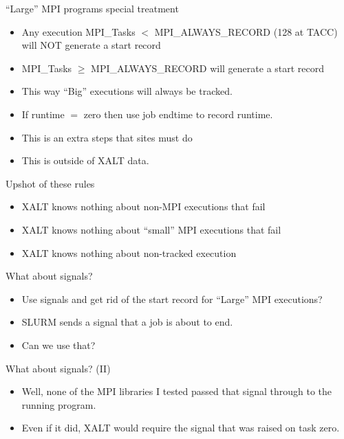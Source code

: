 \documentclass{beamer}
\begin{document}
\begin{frame}{``Large'' MPI programs special treatment}
  \begin{itemize}
    \item Any execution MPI\_Tasks $<$ MPI\_ALWAYS\_RECORD (128 at TACC)
      will NOT generate a start record
    \item MPI\_Tasks $\geq$ MPI\_ALWAYS\_RECORD will generate a start
      record
    \item This way ``Big'' executions will always be tracked.
    \item If runtime $=$ zero then use job endtime to record runtime.
    \item This is an extra steps that sites must do
    \item This is outside of XALT data.
  \end{itemize}
\end{frame}

\begin{frame}{Upshot of these rules}
  \begin{itemize}
    \item XALT knows nothing about non-MPI executions that fail
    \item XALT knows nothing about ``small'' MPI executions that fail
    \item XALT knows nothing about non-tracked execution
  \end{itemize}
\end{frame}

\begin{frame}{What about signals?}
  \begin{itemize}
    \item Use signals and get rid of the start record
      for ``Large'' MPI executions?
    \item SLURM sends a signal that a job is about to end.
    \item Can we use that?
  \end{itemize}
\end{frame}

\begin{frame}{What about signals? (II)}
  \begin{itemize}
    \item Well, none of the MPI libraries I tested passed that signal through
      to the running program.
    \item Even if it did, XALT would require the signal that was
      raised on task zero.
  \end{itemize}
\end{frame}
\end{document}
